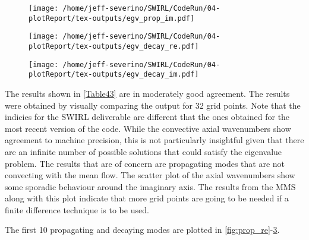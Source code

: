 \begin{figure}[h!]
    \centering
    \texttt{[image: /home/jeff-severino/SWIRL/CodeRun/04-plotReport/tex-outputs/egv\_prop\_im.pdf]}
    \label{fig:prop_im}
\end{figure}

\begin{figure}[h!]
    \centering
    \texttt{[image: /home/jeff-severino/SWIRL/CodeRun/04-plotReport/tex-outputs/egv\_decay\_re.pdf]}
    \label{fig:decay_re} 
\end{figure}

\begin{figure}[h!]
    \centering
    \texttt{[image: /home/jeff-severino/SWIRL/CodeRun/04-plotReport/tex-outputs/egv\_decay\_im.pdf]}
    \label{fig:decay_im} 
\end{figure}








The results shown in \ref{Table43} are in moderately good agreement. The 
results were obtained by visually comparing the output for 32 
grid points. Note that the indicies for the SWIRL deliverable are different that 
the ones obtained for the most recent version of the code. While the 
convective axial wavenumbers show agreement to machine precision, this is not 
particularly insightful given that there are an infinite number of possible solutions 
that could satisfy the eigenvalue problem. The results that are of concern 
are propagating modes that are not convecting with the mean flow.  The scatter plot
of the axial wavenumbers show some sporadic behaviour around the imaginary axis.
The results from the MMS along with this plot indicate that more grid points are going 
to be needed if a finite difference technique is to be used.

The first 10 propagating and decaying modes are plotted in \ref{fig:prop_re}-\ref{fig:decay_im}.





